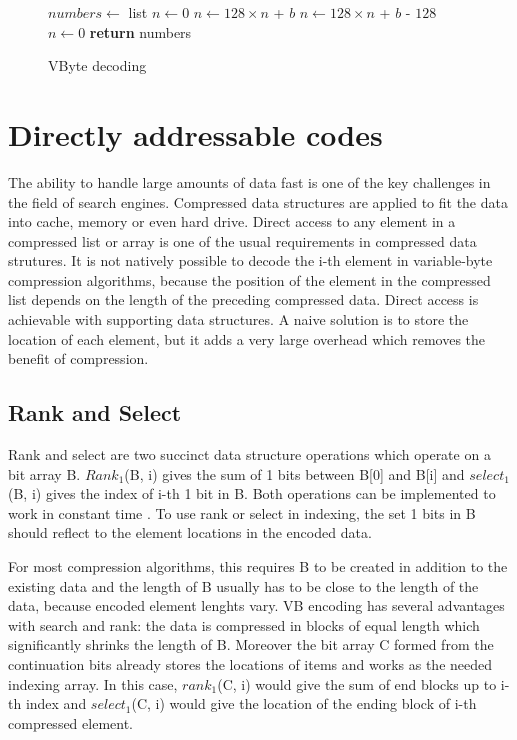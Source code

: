 \begin{figure}[ht]
\centering
  \begin{minipage}{0.5\linewidth}
\begin{algorithmic}[H]
\State $numbers\gets $ list
\State $n\gets 0$
\State $n\gets 128\times n $ + $b$
\Else
\State $n\gets 128\times n $ + $b$ - $128$
\State {}
\State $n\gets 0$
\EndIf
\EndFor
\State \textbf{return} numbers
\EndFunction
\end{algorithmic}
\end{minipage}
\caption{VByte decoding} \label{vbyte_dec}
\end{figure}



\chapter{Directly addressable codes} \label{chapter:DAC}

The ability to handle large amounts of data fast is one of the key challenges in the field of search engines. Compressed data structures are applied to fit the 
data into cache, memory or even hard drive. Direct access to any element in a compressed list or array is one of the usual requirements in compressed data 
strutures. It is not natively possible to decode the i-th element in variable-byte compression algorithms, because the position of the element in the compressed
list depends on the length of the preceding compressed data. Direct access is achievable with supporting data structures. A naive solution is to store the location 
of each element, but it adds a very large overhead which removes the benefit of compression.

\section{Rank and Select}
Rank and select are two succinct data structure operations which operate on a bit array B. $Rank_1$(B, i) gives the sum of 1 bits between B[0] and B[i] and 
$select_1$(B, i) gives the index of i-th 1 bit in B. Both operations can be implemented to work in constant time \citep{gbmp2014sea}. To use rank or select in indexing, the
set 1 bits in B should reflect to the element locations in the encoded data. 

For most compression algorithms, this requires B to be created in addition to the existing data and the length of B usually 
has to be close to the length of the data, because encoded element lenghts vary. VB encoding has several advantages with search and rank: the data is compressed in 
blocks of equal length which significantly shrinks the length of B. Moreover the bit array C formed from the continuation bits already stores the locations of items and works
as the needed indexing array. In this case, $rank_1$(C, i) would give the sum of end blocks up to i-th index and $select_1$(C, i) would give the location of the ending block 
of i-th compressed element.

